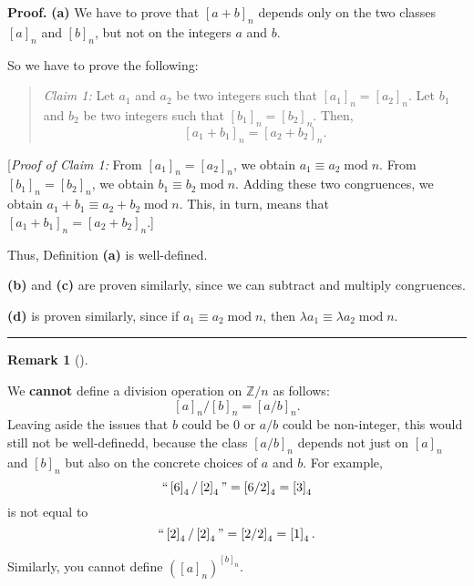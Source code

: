 \documentclass[numbers=enddot,12pt,final,onecolumn,notitlepage]{scrartcl}%
\numberwithin{exer}{subsection}
\theoremstyle{definition}
\newtheorem{remk}[theo]{Remark}
\newenvironment{remark}[1][]
{\begin{remk}[#1]\begin{leftbar}}
{\end{leftbar}\end{remk}}
\newenvironment{statement}{\begin{quote}}{\end{quote}}
\newenvironment{proof}[1][Proof]{\noindent\textbf{#1.} }{\ \rule{0.5em}{0.5em}}
\begin{document}
\begin{proof}
\textbf{(a)} We have to prove that $\left[  a+b\right]  _{n}$ depends only on
the two classes $\left[  a\right]  _{n}$ and $\left[  b\right]  _{n}$, but not
on the integers $a$ and $b$.

So we have to prove the following:

\begin{statement}
\textit{Claim 1:} Let $a_{1}$ and $a_{2}$ be two integers such that $\left[
a_{1}\right]  _{n}=\left[  a_{2}\right]  _{n}$. Let $b_{1}$ and $b_{2}$ be two
integers such that $\left[  b_{1}\right]  _{n}=\left[  b_{2}\right]  _{n}$.
Then,%
\[
\left[  a_{1}+b_{1}\right]  _{n}=\left[  a_{2}+b_{2}\right]  _{n}.
\]

\end{statement}

[\textit{Proof of Claim 1:} From $\left[  a_{1}\right]  _{n}=\left[
a_{2}\right]  _{n}$, we obtain $a_{1}\equiv a_{2}\operatorname{mod}n$. From
$\left[  b_{1}\right]  _{n}=\left[  b_{2}\right]  _{n}$, we obtain
$b_{1}\equiv b_{2}\operatorname{mod}n$. Adding these two congruences, we
obtain $a_{1}+b_{1}\equiv a_{2}+b_{2}\operatorname{mod}n$. This, in turn,
means that $\left[  a_{1}+b_{1}\right]  _{n}=\left[  a_{2}+b_{2}\right]  _{n}$.]

Thus, Definition \textbf{(a)} is well-defined.

\textbf{(b)} and \textbf{(c)} are proven similarly, since we can subtract and
multiply congruences.

\textbf{(d)} is proven similarly, since if $a_{1}\equiv a_{2}%
\operatorname{mod}n$, then $\lambda a_{1}\equiv\lambda a_{2}\operatorname{mod}%
n$.
\end{proof}

\begin{remark}
We \textbf{cannot} define a division operation on $\mathbb{Z}/n$ as follows:%
\[
\left[  a\right]  _{n}/\left[  b\right]  _{n}=\left[  a/b\right]  _{n}.
\]
Leaving aside the issues that $b$ could be $0$ or $a/b$ could be non-integer,
this would still not be well-definedd, because the class $\left[  a/b\right]
_{n}$ depends not just on $\left[  a\right]  _{n}$ and $\left[  b\right]
_{n}$ but also on the concrete choices of $a$ and $b$. For example,
\[
\text{\textquotedblleft}\left[  6\right]  _{4}/\left[  2\right]
_{4}\text{\textquotedblright}=\left[  6/2\right]  _{4}=\left[  3\right]  _{4}%
\]
is not equal to%
\[
\text{\textquotedblleft}\left[  2\right]  _{4}/\left[  2\right]
_{4}\text{\textquotedblright}=\left[  2/2\right]  _{4}=\left[  1\right]  _{4}.
\]


Similarly, you cannot define $\left(  \left[  a\right]  _{n}\right)  ^{\left[
b\right]  _{n}}$.
\end{remark}
\end{document}
